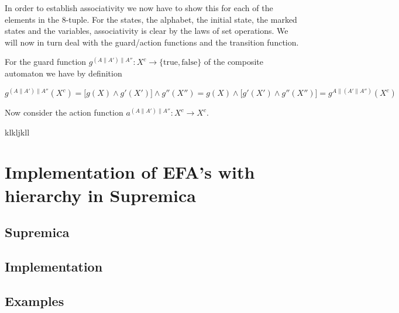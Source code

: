 \documentclass{article}
\begin{document}
\noindent In order to establish associativity we now have to show
this for each of the elements in the 8-tuple. For the states, the
alphabet, the initial state, the marked states and the variables,
associativity is clear by the laws of set operations. We will now
in turn deal with the guard/action functions and the transition
function.

For the guard function $g^{(A\|A')\|A''} : X^c \rightarrow
\{\mathrm{true}, \mathrm{false}\}$ of the composite automaton we
have by definition

\begin{equation}
  g^{(A\|A')\|A''}(X^c) = \big[g(X) \wedge g'(X') \big] \wedge g''(X'') = g(X) \wedge \big[g'(X') \wedge g''(X'')] = g^{A\|(A'\|A'')}(X^c)
\end{equation}

\noindent Now consider the action function $a^{(A\|A')\|A''} : X^c
\rightarrow X^c$.

klkljkll

\section{Implementation of EFA's with hierarchy in Supremica}

\subsection{Supremica}

\subsection{Implementation}\label{Implementation}
\subsection{Examples}
\end{document}

